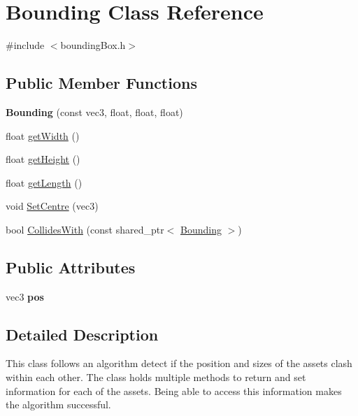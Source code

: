 \hypertarget{classBounding}{\section{Bounding Class Reference}
\label{classBounding}
}


{\ttfamily \#include $<$bounding\-Box.\-h$>$}

\subsection*{Public Member Functions}
\begin{DoxyCompactItemize}
\item 
\hypertarget{classBounding_ac7ed2b50effbd595ded655c77dc5a5bc}{{\bfseries Bounding} (const vec3, float, float, float)}\label{classBounding_ac7ed2b50effbd595ded655c77dc5a5bc}

\item 
float \hyperlink{classBounding_ad1fc6401438da086ae3a74cf5b942d9a}{get\-Width} ()
\item 
float \hyperlink{classBounding_a738f0fd593ae4edd83dc73f26f8ea964}{get\-Height} ()
\item 
float \hyperlink{classBounding_ac5c3654600a9a21d5eae7f6f84ce6137}{get\-Length} ()
\item 
void \hyperlink{classBounding_a276a1ec077a1006cd34a9bd16bbb0fec}{Set\-Centre} (vec3)
\item 
bool \hyperlink{classBounding_a95597f66c6d2bb5b018fdd7eb30b0759}{Collides\-With} (const shared\-\_\-ptr$<$ \hyperlink{classBounding}{Bounding} $>$)
\end{DoxyCompactItemize}
\subsection*{Public Attributes}
\begin{DoxyCompactItemize}
\item 
\hypertarget{classBounding_a5dbd8bfe5d2b3e3e41c2e1e12e53c066}{vec3 {\bfseries pos}}\label{classBounding_a5dbd8bfe5d2b3e3e41c2e1e12e53c066}

\end{DoxyCompactItemize}


\subsection{Detailed Description}
This class follows an algorithm detect if the position and sizes of the assets clash within each other. The class holds multiple methods to return and set information for each of the assets. Being able to access this information makes the algorithm successful. 

